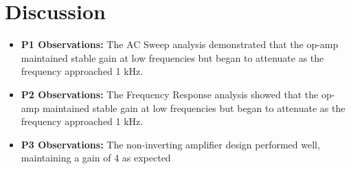 \chapter{Discussion}

\begin{itemize}
    \item \textbf{P1 Observations:} The AC Sweep analysis demonstrated that the op-amp maintained stable gain at low frequencies but began to attenuate as the frequency approached 1 kHz.
    \item \textbf{P2 Observations:} The Frequency Response analysis showed that the op-amp maintained stable gain at low frequencies but began to attenuate as the frequency approached 1 kHz. 
    \item \textbf{P3 Observations:} The non-inverting amplifier design performed well, maintaining a gain of 4 as expected
\end{itemize}
